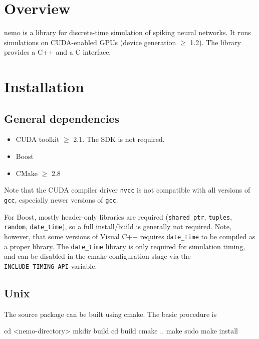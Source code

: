 \documentclass[a4paper]{article}
\newcommand{\code}[1]{\texttt{#1}}
\newcommand{\command}[1]{\texttt{#1}}
\newcommand{\library}[1]{\texttt{#1}}
\begin{document}
\maketitle

\section{Overview}

nemo is a library for discrete-time simulation of spiking neural networks.
It runs simulations on CUDA-enabled GPUs (device generation $\geq$ 1.2).
The library provides a C++ and a C interface. 

\section{Installation}

\subsection{General dependencies}

\begin{itemize}
	\item CUDA toolkit $\geq$ 2.1. The SDK is not required.
	\item Boost
	\item CMake $\geq$ 2.8
\end{itemize}

Note that the CUDA compiler driver \command{nvcc} is not compatible with all versions
of \command{gcc}, especially newer versions of \command{gcc}.

For Boost, mostly header-only libraries are required (\library{shared\_ptr}, \library{tuples},
\library{random}, \library{date\_time}), so a full install/build is generally not required. 
Note, however, that some versions of Visual C++ requires \library{date\_time} to be compiled as
a proper library. 
The \library{date\_time} library is only required for simulation timing,
	and can be disabled in the cmake configuration stage via the \code{INCLUDE\_TIMING\_API} variable.

\subsection{Unix}

The source package can be built using cmake. The basic procedure is 

\begin{shell}
cd <nemo-directory>
mkdir build
cd build
cmake ..
make
sudo make install
\end{shell}
\end{document}
